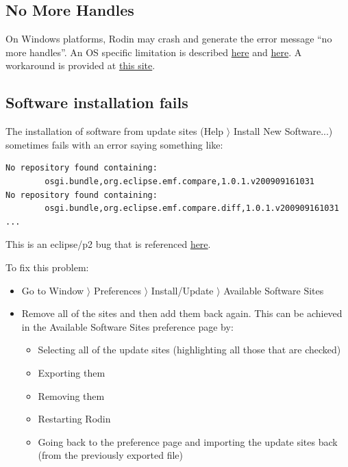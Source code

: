 \subsection{No More Handles}

On Windows platforms, Rodin may crash and generate the error message  ``no more handles''. An OS specific limitation is described \href{http://journals.jevon.org/users/jevon-phd/entry/19833}{here} and \href{https://bugs.eclipse.org/bugs/show_bug.cgi?id=211124}{here}. A workaround is provided at \href{http://blogs.msdn.com/b/ntdebugging/archive/2007/01/04/desktop-heap-overview.aspx}{this site}. 

\subsection{Software installation fails}

The installation of software from update sites (\textsf{Help $\rangle$ Install New Software...}) sometimes fails with an error saying something like: 

\begin{verbatim}
No repository found containing: 
        osgi.bundle,org.eclipse.emf.compare,1.0.1.v200909161031
No repository found containing: 
        osgi.bundle,org.eclipse.emf.compare.diff,1.0.1.v200909161031
...
\end{verbatim}


This is an eclipse/p2 bug that is referenced \href{http://stackoverflow.com/questions/511367/error-when-updating-eclipse}{here}. 

To fix this problem: 

\begin{itemize}
	\item Go to \textsf{Window $\rangle$ Preferences $\rangle$ Install/Update $\rangle$ Available Software Sites} 
	\item Remove all of the sites and then add them back again. This can be achieved in the \textsf{Available Software Sites} preference page by: 
	\begin{itemize}
		\item Selecting all  of the update sites (highlighting all those that are checked) 
		\item Exporting them 
		\item Removing them
		\item Restarting Rodin
		\item Going back to the preference page and importing the update sites back (from the previously exported file) 
	\end{itemize}
\end{itemize}

